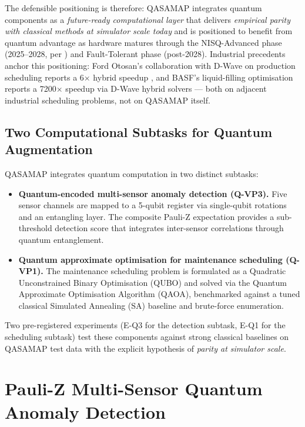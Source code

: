 The defensible positioning is therefore: QASAMAP integrates quantum components as a \emph{future-ready computational layer} that delivers \emph{empirical parity with classical methods at simulator scale today} and is positioned to benefit from quantum advantage as hardware matures through the NISQ-Advanced phase (2025--2028, per \cite{tsai2026roadmap}) and Fault-Tolerant phase (post-2028). Industrial precedents anchor this positioning: Ford Otosan's collaboration with D-Wave on production scheduling reports a 6$\times$ hybrid speedup \cite{fordotosan2024dwave}, and BASF's liquid-filling optimisation reports a 7200$\times$ speedup via D-Wave hybrid solvers \cite{basf2024dwave} --- both on adjacent industrial scheduling problems, not on QASAMAP itself.

\subsection{Two Computational Subtasks for Quantum Augmentation}

QASAMAP integrates quantum computation in two distinct subtasks:

\begin{itemize}
    \item \textbf{Quantum-encoded multi-sensor anomaly detection (Q-VP3).} Five sensor channels are mapped to a 5-qubit register via single-qubit rotations and an entangling layer. The composite Pauli-Z expectation provides a sub-threshold detection score that integrates inter-sensor correlations through quantum entanglement.
    \item \textbf{Quantum approximate optimisation for maintenance scheduling (Q-VP1).} The maintenance scheduling problem is formulated as a Quadratic Unconstrained Binary Optimisation (QUBO) and solved via the Quantum Approximate Optimisation Algorithm (QAOA), benchmarked against a tuned classical Simulated Annealing (SA) baseline and brute-force enumeration.
\end{itemize}

Two pre-registered experiments (E-Q3 for the detection subtask, E-Q1 for the scheduling subtask) test these components against strong classical baselines on QASAMAP test data with the explicit hypothesis of \emph{parity at simulator scale}.

\section{Pauli-Z Multi-Sensor Quantum Anomaly Detection}

